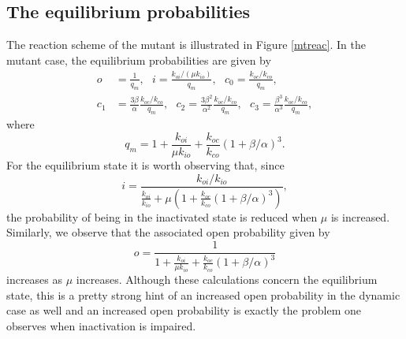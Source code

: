 \subsection{The equilibrium probabilities}
The reaction scheme of the mutant is illustrated in Figure \ref{mtreac}. In
the mutant case, the equilibrium probabilities are given by%
\begin{align}
o  &  =\frac{1}{q_{m}},\text{ }i=\frac{k_{oi}/\left(  \mu k_{io}\right)
}{q_{m}},\text{ }c_{0}=\frac{k_{oc}/k_{co}}{q_{m}}, \\
c_{1}  &  =\frac{3\beta}{\alpha}\frac{k_{oc}/k_{co}}{q_{m}},\text{ }%
c_{2}=\frac{3\beta^{2}}{\alpha^{2}}\frac{k_{oc}/k_{co}}{q_{m}},\text{ }%
c_{3}=\frac{\beta^{3}}{\alpha^{3}}\frac{k_{oc}/k_{co}}{q_{m}}, \nonumber
\end{align}
where%
\[
q_{m}=1+\frac{k_{oi}}{\mu k_{io}}+\frac{k_{oc}}{k_{co}}\left(  1+\beta
/\alpha\right)  ^{3}.
\]
For the equilibrium state it is worth observing that, since
\[
i=\frac{k_{oi}/k_{io}}{\frac{k_{oi}}{k_{io}}+\mu\left(  1+\frac{k_{oc}}%
{k_{co}}\left(  1+\beta/\alpha\right)  ^{3}\right)  },%
\]
the probability of being in the inactivated state is reduced when $\mu$ is
increased. Similarly, we observe that the associated open probability given
by%
\[
o=\frac{1}{1+\frac{k_{oi}}{\mu k_{io}}+\frac{k_{oc}}{k_{co}}\left(
1+\beta/\alpha\right)  ^{3}}%
\]
increases as $\mu$ increases. Although these calculations concern the 
equilibrium state, this is a pretty strong hint of an increased open 
probability in the dynamic case as well and an increased open probability is 
exactly the problem one observes when inactivation is impaired.

